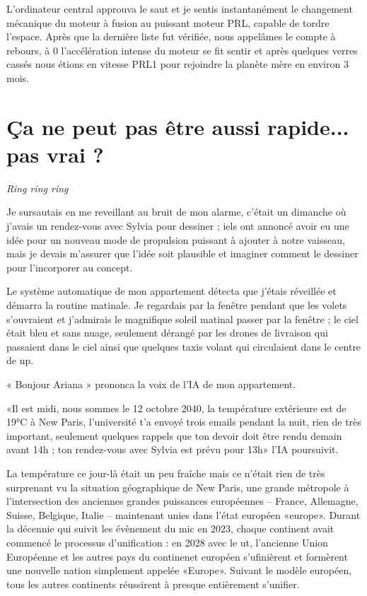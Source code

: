 \documentclass[12pt,hidelinks,a4paper]{book}
\begin{document}
\bigskip

L'ordinateur central approuva le saut et je sentis instantanément
le changement mécanique du moteur à fusion au puissant moteur PRL,
capable de tordre l'espace. Après que la dernière liste fut vérifiée,
nous appelâmes le compte à rebours, à 0 l'accélération intense du
moteur se fit sentir et après quelques verres cassés nous étions en
vitesse PRL1 pour rejoindre la planète mère en environ 3 mois.\par
\bigskip

\chapter{Ça ne peut pas être aussi rapide... pas vrai ?}

\textit{Ring ring ring}

Je sursautais en me reveillant au bruit de mon alarme, c'était un
dimanche où j'avais un rendez-vous avec Sylvia pour dessiner ; iels
ont annoncé avoir eu une idée pour un nouveau mode de propulsion puissant
à ajouter à notre vaisseau, mais je devais m'assurer que l'idée soit
plausible et imaginer comment le dessiner pour l'incorporer au concept.\par

\bigskip
Le système automatique de mon appartement détecta que j'étais réveillée
et démarra la routine matinale. Je regardais par la fenêtre pendant
que les volets s'ouvraient et j'admirais le magnifique soleil matinal
passer par la fenêtre ; le ciel était bleu et sans nuage, seulement
dérangé par les drones de livraison qui passaient dans le ciel ainsi
que quelques taxis volant qui circulaient dans le centre de \gls{np}. \par

\bigskip
« Bonjour Ariana » prononca la voix de l'IA de mon appartement.\par

\bigskip
«Il est midi, nous sommes le 12 octobre 2040, la température extérieure
est de 19°C à New Paris, l'université t'a envoyé trois emails pendant
la nuit, rien de très important, seulement quelques rappels que ton
devoir doit être rendu demain avant 14h ; ton rendez-vous avec Sylvia
est prévu pour 13h» l'IA poursuivit.\par

\bigskip

La température ce jour-là était un peu fraîche mais ce n'était rien
de très surprenant vu la situation géographique de New Paris, une
grande métropole à l'intersection des anciennes grandes puissances
européennes -- France, Allemagne, Suisse, Belgique, Italie -- maintenant
unies dans l'état européen «\gls{europe}». Durant la décennie
qui suivit les évènement du \gls{mic} en 2023, chaque continent
avait commencé le processus d'unification : en 2028 avec le \gls{ut},
l'ancienne Union Européenne et les autres pays du continenet européen
s'ufinièrent et formèrent une nouvelle nation simplement appelée «Europe».
Suivant le modèle européen, tous les autres continents réussirent
à presque entièrement s'unifier.\par
\end{document}

